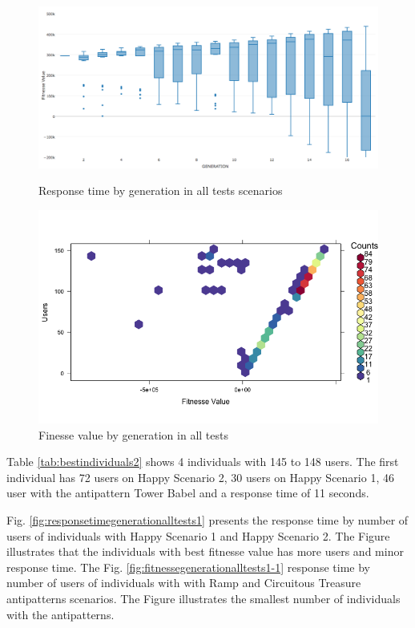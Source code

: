 \documentclass[times]{stvrauth}
\begin{document}
\begin{figure}[h]
\begin{minipage}{.5\textwidth}
\centering
\includegraphics[width=1\textwidth]{./images/experiment2-3.png}
\caption{Response time by generation in all tests scenarios}
\label{fig:summaryboxplot2}
\end{minipage}
\begin{minipage}{.5\textwidth}
\centering
\includegraphics[width=1\textwidth]{./images/experiment2-4.png}
\caption{Finesse value by generation in all tests}
\label{fig:density2}
\end{minipage}

\end{figure}

Table \ref{tab:bestindividuals2} shows 4 individuals with 145 to 148 users.  The first individual has 72 users on Happy Scenario 2, 30 users on Happy Scenario 1, 46 user with the antipattern Tower Babel and a response time of 11 seconds. 

Fig. \ref{fig:responsetimegenerationalltests1} presents the response time by number of users of individuals with Happy Scenario 1 and Happy Scenario 2. The Figure illustrates that the individuals with best fitnesse value has more users and minor response time. The Fig. \ref{fig:fitnessegenerationalltests1-1} response time by number of users of individuals with with Ramp and Circuitous Treasure antipatterns scenarios. The Figure illustrates the smallest number of individuals with the antipatterns.
\end{document}
